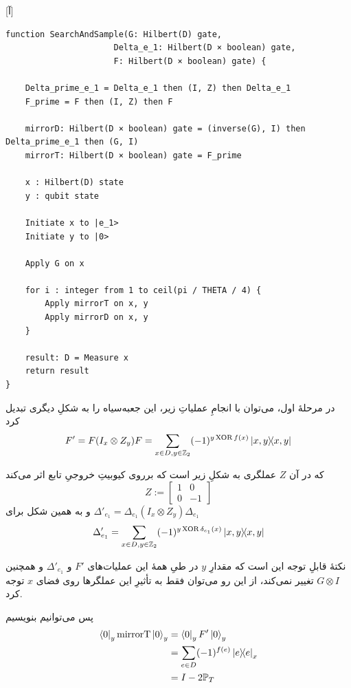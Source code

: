 [آ]
\begin{latin}
\begin{lstlisting}
function SearchAndSample(G: Hilbert(D) gate, 
                      Delta_e_1: Hilbert(D × boolean) gate,
                      F: Hilbert(D × boolean) gate) {

    Delta_prime_e_1 = Delta_e_1 then (I, Z) then Delta_e_1
    F_prime = F then (I, Z) then F

    mirrorD: Hilbert(D × boolean) gate = (inverse(G), I) then Delta_prime_e_1 then (G, I)
    mirrorT: Hilbert(D × boolean) gate = F_prime

    x : Hilbert(D) state
    y : qubit state

    Initiate x to |e_1>
    Initiate y to |0>

    Apply G on x
    
    for i : integer from 1 to ceil(pi / THETA / 4) {
        Apply mirrorT on x, y
        Apply mirrorD on x, y
    }

    result: D = Measure x
    return result
}
\end{lstlisting}
\end{latin}

در مرحلهٔ اول، می‌توان با انجامِ عملیاتِ زیر، این جعبه‌سیاه را به شکلِ دیگری تبدیل کرد
\begin{equation}
    F' = F (I_x \otimes Z_y) F = \sum_{x \in D, y \in \mathbb{Z}_2} (-1)^{y \XOR f(x)}\dyad{x, y}{x, y}
\end{equation}

که در آن $Z$ عملگری به شکلِ زیر است که برروی کیوبیتِ خروجیِ تابع اثر می‌کند
\begin{equation}
    Z := \begin{bmatrix}
    1 & 0 \\
    0 & -1
\end{bmatrix}
\end{equation}
و به همین شکل برای 
$\Delta'_{e_1} = \Delta_{e_1} (I_x \otimes Z_y) \Delta_{e_1}$
\begin{equation}
    \Delta'_{e_1} = \sum_{x \in D, y \in \mathbb{Z}_2} (-1)^{y \XOR \delta_{e_1}(x)}\dyad{x, y}{x, y}
\end{equation}

نکتهٔ قابلِ توجه این است که مقدارِ $y$ در طیِ همهٔ این عملیات‌های $F'$ و $\Delta'_{e_1}$ و همچنین $G \otimes I$ تغییر نمی‌کند، از این رو می‌توان فقط به تأثیرِ این عملگرها روی فضای $x$ توجه کرد.

پس می‌توانیم بنویسیم
\begin{align}
    \bra{0}_y \mathrm{mirrorT} \ket{0}_y &= \bra{0}_y F' \ket{0}_y \\ 
    &= \sum_{e \in D} (-1)^{f(e)}\dyad{e}_x \\
    &= I - 2\mathbb{P}_T
\end{align}

